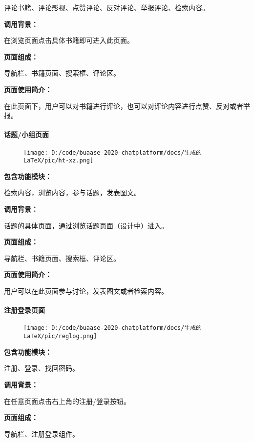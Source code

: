 \documentclass[
]{article}
\begin{document}
评论书籍、评论影视、点赞评论、反对评论、举报评论、检索内容。

\textbf{调用背景：}

在浏览页面点击具体书籍即可进入此页面。

\textbf{页面组成：}

导航栏、书籍页面、搜索框、评论区。

\textbf{页面使用简介：}

在此页面下，用户可以对书籍进行评论，也可以对评论内容进行点赞、反对或者举报。

\hypertarget{header-n1322}{%
\paragraph{话题/小组页面}\label{header-n1322}}

\begin{figure}
\centering
\texttt{[image: D:/code/buaase-2020-chatplatform/docs/生成的LaTeX/pic/ht-xz.png]}
\caption{}
\end{figure}

\textbf{包含功能模块：}

检索内容，浏览内容，参与话题，发表图文。

\textbf{调用背景：}

话题的具体页面，通过浏览话题页面（设计中）进入。

\textbf{页面组成：}

导航栏、书籍页面、搜索框、评论区。

\textbf{页面使用简介：}

用户可以在此页面参与讨论，发表图文或者检索内容。

\hypertarget{header-n1332}{%
\paragraph{注册登录页面}\label{header-n1332}}

\begin{figure}
\centering
\texttt{[image: D:/code/buaase-2020-chatplatform/docs/生成的LaTeX/pic/reglog.png]}
\caption{}
\end{figure}

\textbf{包含功能模块：}

注册、登录、找回密码。

\textbf{调用背景：}

在任意页面点击右上角的注册/登录按钮。

\textbf{页面组成：}

导航栏、注册登录组件。
\end{document}

